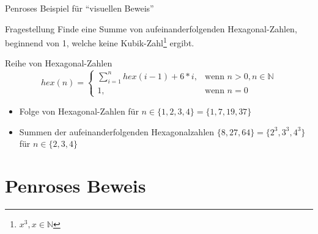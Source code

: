 \begin{frame}{Penroses Beispiel für \enquote{visuellen Beweis}}
\label{sec:visual_proof}
    \begin{block}{Fragestellung}
        Finde eine Summe von aufeinanderfolgenden Hexagonal-Zahlen, beginnend von 1, welche keine Kubik-Zahl\footnote{$x^3, x \in \mathbb{N}$} ergibt.
    \end{block}
    \begin{block}{Reihe von Hexagonal-Zahlen}
        \[
            hex(n) =
            \begin{cases}
                \sum_{i=1}^{n} hex(i-1) + 6*i ,     & \text{wenn } n > 0, n \in \mathbb{N}\\
                1                             ,     & \text{wenn } n = 0
            \end{cases}
        \]
    \end{block}
\end{frame}

\begin{frame}
\begin{itemize}
    \item Folge von Hexagonal-Zahlen für $ n \in \{1, 2, 3, 4\} = \{1, 7, 19, 37\}$
    \item Summen der aufeinanderfolgenden Hexagonalzahlen $\{ 8, 27, 64\} = \{ 2^3, 3^3, 4^3\}$ für $n \in \{2, 3, 4\}$
\end{itemize}
\end{frame}

\section{Penroses Beweis}
\label{sec:penroses_proof}


